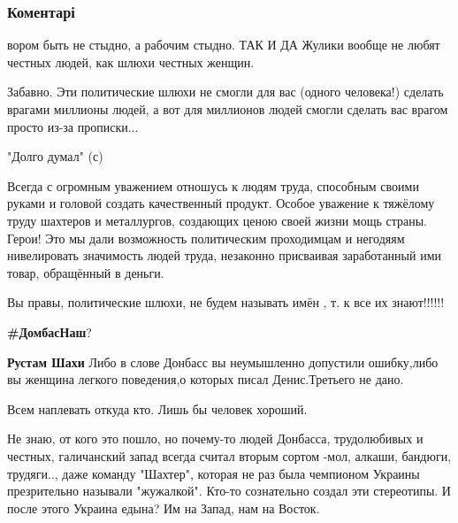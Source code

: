  
 
 
 
 
\subsubsection{Коментарі}

\begin{itemize} %
вором быть не стыдно, а рабочим стыдно. ТАК И ДА Жулики вообще не любят честных людей, как шлюхи честных женщин.


Забавно. Эти политические шлюхи не смогли для вас (одного человека!) сделать
врагами миллионы людей, а вот для миллионов людей смогли сделать вас врагом
просто из-за прописки...

"Долго думал" (с)


Всегда с огромным уважением отношусь к людям труда, способным своими руками и
головой создать качественный продукт. Особое уважение к тяжёлому труду шахтеров
и металлургов, создающих ценою своей жизни мощь страны. Герои! Это мы дали
возможность политическим проходимцам и негодяям нивелировать значимость людей
труда, незаконно присваивая заработанный ими товар, обращённый в деньги.

Вы правы, политические шлюхи, не будем называть имён , т. к все их знают!!!!!!

\textbf{\#ДомбасНаш}?

\begin{itemize} %
\textbf{Рустам Шахи} Либо в слове Донбасс вы неумышленно допустили ошибку,либо вы женщина легкого поведения,о которых писал Денис.Третьего не дано.
\end{itemize} %

Всем наплевать откуда кто.
Лишь бы человек хороший.


Не знаю, от кого это пошло, но почему-то людей Донбасса, трудолюбивых и
честных, галичанский запад всегда считал вторым сортом -мол, алкаши, бандюги,
трудяги.., даже команду "Шахтер", которая не раз была чемпионом Украины
презрительно называли "жужалкой". Кто-то сознательно создал эти стереотипы. И
после этого Украина едына? Им на Запад, нам на Восток.


\end{itemize}

